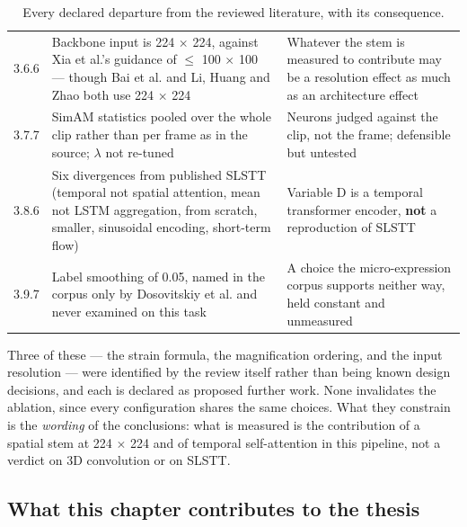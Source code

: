 \begin{table}[htbp]
\begin{tabular}{@{}p{0.85cm} p{6.0cm} p{6.6cm}@{}}
		3.6.6 & Backbone input is 224 $\times$ 224, against Xia et al.'s guidance of $\leq$ 100 $\times$ 100 --- though Bai et al. and Li, Huang and Zhao both use 224 $\times$ 224 & Whatever the stem is measured to contribute may be a resolution effect as much as an architecture effect \\
		3.7.7 & SimAM statistics pooled over the whole clip rather than per frame as in the source; $\lambda$ not re-tuned & Neurons judged against the clip, not the frame; defensible but untested \\
		3.8.6 & Six divergences from published SLSTT (temporal not spatial attention, mean not LSTM aggregation, from scratch, smaller, sinusoidal encoding, short-term flow) & Variable D is a temporal transformer encoder, \textbf{not} a reproduction of SLSTT \\
		3.9.7 & Label smoothing of 0.05, named in the corpus only by Dosovitskiy et al. and never examined on this task & A choice the micro-expression corpus supports neither way, held constant and unmeasured \\
		\hline
	\end{tabular}
	\caption[Every declared departure from the reviewed literature]{Every declared departure from the reviewed literature, with its consequence.}
	\label{tab:divergence-ledger}
\end{table}

Three of these --- the strain formula, the magnification ordering, and the input resolution --- were identified by the review itself rather than being known design decisions, and each is declared as proposed further work. None invalidates the ablation, since every configuration shares the same choices. What they constrain is the \textit{wording} of the conclusions: what is measured is the contribution of a spatial stem at 224 $\times$ 224 and of temporal self-attention in this pipeline, not a verdict on 3D convolution or on SLSTT.

\subsection{What this chapter contributes to the thesis}
\label{sec:ch3-contribution}

